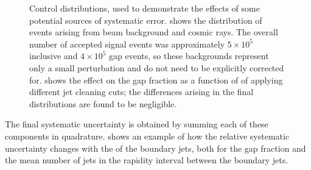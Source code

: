\begin{figure}[htpb]
{    \label{fig:gbj:quality_comparison}}
  \caption{Control distributions, used to demonstrate the effects of some potential sources of systematic error. \protect{} shows the \DeltaY distribution of events arising from beam background and cosmic rays. The overall number of accepted signal events was approximately $5 \times 10^{5}$ inclusive and $4 \times 10^{5}$ gap events, so these backgrounds represent only a small perturbation and do not need to be explicitly corrected for. \protect{} shows the effect on the gap fraction as a function of \Qnought of applying different jet cleaning cuts; the differences arising in the final distributions are found to be negligible.}
  \label{fig:gbj:control_distributions}
\end{figure}

The final systematic uncertainty is obtained by summing each of these components in quadrature.
 shows an example of how the relative systematic
uncertainty changes with the \DeltaY of the boundary jets, both for the gap fraction
and the mean number of jets in the rapidity interval between the boundary jets.

